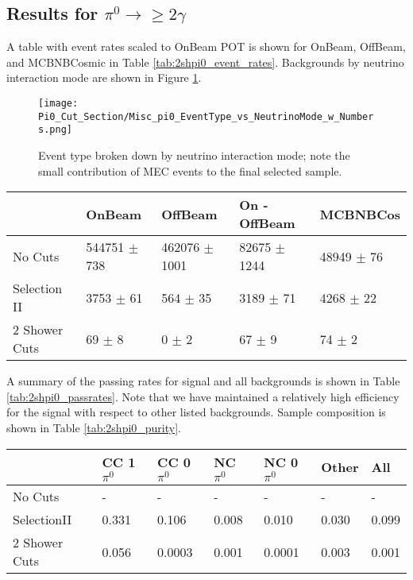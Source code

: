 \documentclass{article}
\begin{document}
\clearpage
\subsection{Results for $\pi^0\rightarrow \geq 2 \gamma$}
\par A table with event rates scaled to OnBeam POT is shown for OnBeam, OffBeam, and MCBNBCosmic in Table \ref{tab:2shpi0_event_rates}. Backgrounds by neutrino interaction mode are shown in Figure \ref{fig:physics_pi0_inttype}. 

\begin{figure}[h!]
\centering
\texttt{[image: Pi0\_Cut\_Section/Misc\_pi0\_EventType\_vs\_NeutrinoMode\_w\_Numbers.png]}
\caption{ Event type broken down by neutrino interaction mode; note the small contribution of MEC events to the final selected sample. }
\label{fig:physics_pi0_inttype}
\end{figure}

\begin{table*} 
 \centering
 \begin{tabular}{| l | l | l | l | l |}
  \hline
   & OnBeam & OffBeam & On - OffBeam & MCBNBCos \\ [0.1ex] \hline
No Cuts & 544751 $\pm$ 738 & 462076 $\pm$ 1001 & 82675 $\pm$ 1244 & 48949 $\pm$ 76 \\ 
Selection II & 3753 $\pm$ 61 & 564 $\pm$ 35 & 3189 $\pm$ 71 & 4268 $\pm$ 22 \\ 
2 Shower Cuts & 69 $\pm$ 8 & 0 $\pm$ 2 & 67 $\pm$ 9 & 74 $\pm$ 2  \\ \hline
\end{tabular}
 \end{table*}

\par A summary of the passing rates for signal and all backgrounds is shown in Table \ref{tab:2shpi0_passrates}.  Note that we have maintained a relatively high efficiency for the signal with respect to other listed backgrounds. Sample composition is shown in Table \ref{tab:2shpi0_purity}. 

\begin{table*}
\centering
{}
 \begin{tabular}{| l | l | l |l|l|l|l|}
 \hline
 & CC 1$\pi^0$ & CC 0$\pi^0$ & NC $\pi^0$ & NC 0$\pi^0$ & Other & All \\ [0.1ex] \hline
No Cuts & - & - & - & - & - & -\\
SelectionII & 0.331 & 0.106 & 0.008 & 0.010 & 0.030 & 0.099 \\ 
2 Shower Cuts & 0.056 & 0.0003 & 0.001 & 0.0001 & 0.003 & 0.001 \\ \hline
\end{tabular}
\end{table*}
\end{document}
